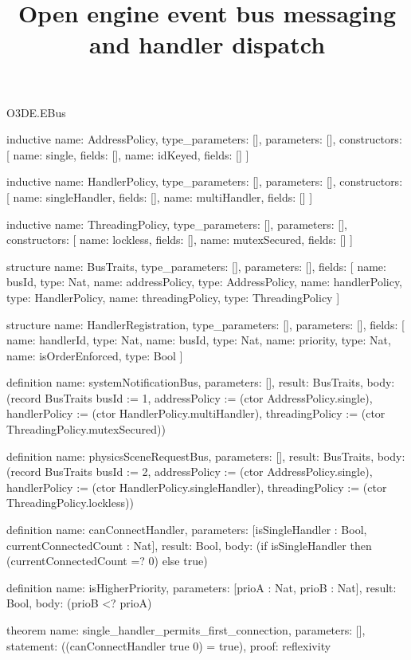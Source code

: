 \begin{lexlean}{O3DE.EBus}
\title{Open engine event bus messaging and handler dispatch}
\begin{semanticmodule}
inductive{
  name: AddressPolicy,
  type_parameters: [],
  parameters: [],
  constructors: [
    {name: single, fields: []},
    {name: idKeyed, fields: []}
  ]
}

inductive{
  name: HandlerPolicy,
  type_parameters: [],
  parameters: [],
  constructors: [
    {name: singleHandler, fields: []},
    {name: multiHandler, fields: []}
  ]
}

inductive{
  name: ThreadingPolicy,
  type_parameters: [],
  parameters: [],
  constructors: [
    {name: lockless, fields: []},
    {name: mutexSecured, fields: []}
  ]
}

structure{
  name: BusTraits,
  type_parameters: [],
  parameters: [],
  fields: [
    {name: busId, type: Nat},
    {name: addressPolicy, type: AddressPolicy},
    {name: handlerPolicy, type: HandlerPolicy},
    {name: threadingPolicy, type: ThreadingPolicy}
  ]
}

structure{
  name: HandlerRegistration,
  type_parameters: [],
  parameters: [],
  fields: [
    {name: handlerId, type: Nat},
    {name: busId, type: Nat},
    {name: priority, type: Nat},
    {name: isOrderEnforced, type: Bool}
  ]
}

definition{
  name: systemNotificationBus,
  parameters: [],
  result: BusTraits,
  body: (record BusTraits {busId := 1, addressPolicy := (ctor AddressPolicy.single), handlerPolicy := (ctor HandlerPolicy.multiHandler), threadingPolicy := (ctor ThreadingPolicy.mutexSecured)})
}

definition{
  name: physicsSceneRequestBus,
  parameters: [],
  result: BusTraits,
  body: (record BusTraits {busId := 2, addressPolicy := (ctor AddressPolicy.single), handlerPolicy := (ctor HandlerPolicy.singleHandler), threadingPolicy := (ctor ThreadingPolicy.lockless)})
}

definition{
  name: canConnectHandler,
  parameters: [isSingleHandler : Bool, currentConnectedCount : Nat],
  result: Bool,
  body: (if isSingleHandler then (currentConnectedCount =? 0) else true)
}

definition{
  name: isHigherPriority,
  parameters: [prioA : Nat, prioB : Nat],
  result: Bool,
  body: (prioB <? prioA)
}

theorem{
  name: single_handler_permits_first_connection,
  parameters: [],
  statement: ((canConnectHandler true 0) = true),
  proof: reflexivity{}
}


\end{semanticmodule}
\end{lexlean}
